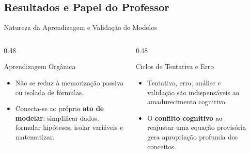 \documentclass[10pt, aspectratio=169]{beamer}
\begin{document}
\subsection[Resultados]{Resultados e Papel do Professor}
\begin{frame}{Natureza da Aprendizagem e Validação de Modelos}
    \transglitter[direction=0, duration=0.4]
    \begin{columns}[T]
        \begin{column}{0.48\textwidth}
            \begin{block}{Aprendizagem Orgânica}
                \begin{itemize}
                    \item Não se reduz à memorização passiva ou isolada de fórmulas.
                    \pause
                    \item Conecta-se ao próprio \textbf{ato de modelar}: simplificar dados, formular hipóteses, isolar variáveis e matematizar.
                \end{itemize}
            \end{block}
        \end{column}
        \begin{column}{0.48\textwidth}
            \begin{exampleblock}{Ciclos de Tentativa e Erro}
                \begin{itemize}
                    \item Tentativa, erro, análise e validação são indispensáveis ao amadurecimento cognitivo.
                    \pause
                    \item O \textbf{conflito cognitivo} ao reajustar uma equação provisória gera apropriação profunda dos conceitos.
                \end{itemize}
            \end{exampleblock}
        \end{column}
    \end{columns}
\end{frame}
\end{document}
